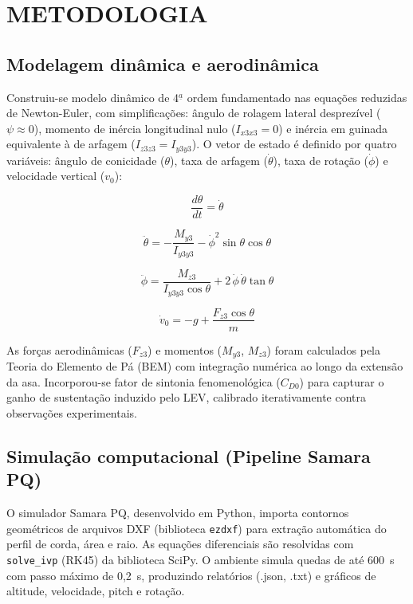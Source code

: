 \documentclass[12pt,fleqn]{article}
\begin{document}
\section{METODOLOGIA}

\subsection{Modelagem dinâmica e aerodinâmica}

Construiu-se modelo dinâmico de 4$^{\underline{a}}$ ordem fundamentado nas equações reduzidas de Newton-Euler, com simplificações: ângulo de rolagem lateral desprezível ($\psi \approx 0$), momento de inércia longitudinal nulo ($I_{x3x3}=0$) e inércia em guinada equivalente à de arfagem ($I_{z3z3}=I_{y3y3}$). O vetor de estado é definido por quatro variáveis: ângulo de conicidade ($\theta$), taxa de arfagem ($\dot\theta$), taxa de rotação ($\dot\phi$) e velocidade vertical ($v_0$):

\begin{equation}
\frac{d\theta}{dt} = \dot\theta
\end{equation}

\begin{equation}
\ddot\theta = -\frac{M_{y3}}{I_{y3y3}} - \dot\phi^2 \sin\theta \cos\theta
\end{equation}

\begin{equation}
\ddot\phi = \frac{M_{z3}}{I_{y3y3} \cos\theta} + 2\,\dot\phi\,\dot\theta \tan\theta
\end{equation}

\begin{equation}
\dot v_0 = -g + \frac{F_{z3} \cos\theta}{m}
\end{equation}

As forças aerodinâmicas ($F_{z3}$) e momentos ($M_{y3}$, $M_{z3}$) foram calculados pela Teoria do Elemento de Pá (BEM) com integração numérica ao longo da extensão da asa. Incorporou-se fator de sintonia fenomenológica ($C_{D0}$) para capturar o ganho de sustentação induzido pelo LEV, calibrado iterativamente contra observações experimentais.

\subsection{Simulação computacional (Pipeline Samara PQ)}

O simulador Samara PQ, desenvolvido em Python, importa contornos geométricos de arquivos DXF (biblioteca \texttt{ezdxf}) para extração automática do perfil de corda, área e raio. As equações diferenciais são resolvidas com \texttt{solve\_ivp} (RK45) da biblioteca SciPy. O ambiente simula quedas de até 600~s com passo máximo de 0,2~s, produzindo relatórios (.json, .txt) e gráficos de altitude, velocidade, pitch e rotação.
\end{document}
